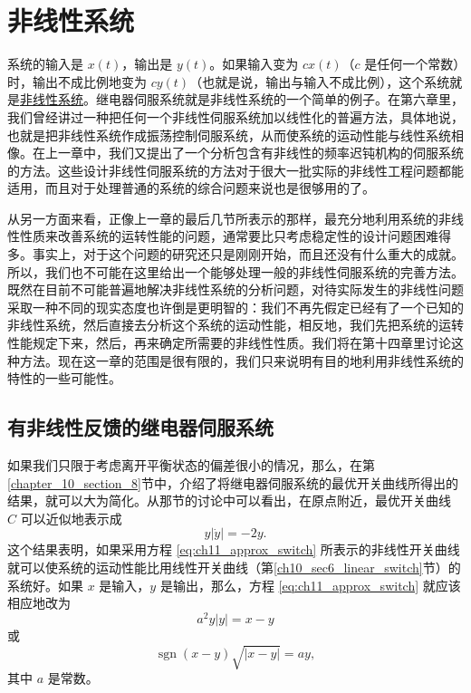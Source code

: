 
\chapter{非线性系统}

系统的输入是 $x(t)$，输出是 $y(t)$。如果输入变为 $cx(t)$（$c$ 是任何一个常数）时，输出不成比例地变为 $cy(t)$（也就是说，输出与输入不成比例），这个系统就是\underline{非线性系统}。继电器伺服系统就是非线性系统的一个简单的例子。在第六章里，我们曾经讲过一种把任何一个非线性伺服系统加以线性化的普遍方法，具体地说，也就是把非线性系统作成振荡控制伺服系统，从而使系统的运动性能与线性系统相像。在上一章中，我们又提出了一个分析包含有非线性的频率迟钝机构的伺服系统的方法。这些设计非线性伺服系统的方法对于很大一批实际的非线性工程问题都能适用，而且对于处理普通的系统的综合问题来说也是很够用的了。

从另一方面来看，正像上一章的最后几节所表示的那样，最充分地利用系统的非线性性质来改善系统的运转性能的问题，通常要比只考虑稳定性的设计问题困难得多。事实上，对于这个问题的研究还只是刚刚开始，而且还没有什么重大的成就。所以，我们也不可能在这里给出一个能够处理一般的非线性伺服系统的完善方法。既然在目前不可能普遍地解决非线性系统的分析问题，对待实际发生的非线性问题采取一种不同的现实态度也许倒是更明智的：我们不再先假定已经有了一个已知的非线性系统，然后直接去分析这个系统的运动性能，相反地，我们先把系统的运转性能规定下来，然后，再来确定所需要的非线性性质。我们将在第十四章里讨论这种方法。现在这一章的范围是很有限的，我们只来说明有目的地利用非线性系统的特性的一些可能性。

\section{有非线性反馈的继电器伺服系统}

如果我们只限于考虑离开平衡状态的偏差很小的情况，那么，在第\ref{chapter_10_section_8}节中，介绍了将继电器伺服系统的最优开关曲线所得出的结果，就可以大为简化。从那节的讨论中可以看出，在原点附近，最优开关曲线 $C$ 可以近似地表示成
\begin{equation}\label{eq:ch11_approx_switch}
y |\dot{y}| = -2y.
\end{equation}
这个结果表明，如果采用方程 \eqref{eq:ch11_approx_switch} 所表示的非线性开关曲线就可以使系统的运动性能比用线性开关曲线（第\ref{ch10_sec6_linear_switch}节）的系统好。如果 $x$ 是输入，$y$ 是输出，那么，方程 \eqref{eq:ch11_approx_switch} 就应该相应地改为
\begin{equation}\label{eq:ch11_feedback1}
a^2 y | y | = x - y
\end{equation}
或
\begin{equation}\label{eq:ch11_serme}
\operatorname{sgn}(x - y) \sqrt{|x - y|} = a y,
\end{equation}
其中 $a$ 是常数。

